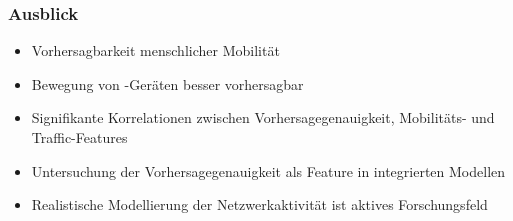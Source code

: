 \documentclass{beamer}
\begin{document}
\begin{frame}
  \frametitle{Ausblick}
  
  \begin{itemize}
    \item Vorhersagbarkeit menschlicher Mobilität
    \item Bewegung von -Geräten besser vorhersagbar
    \item Signifikante Korrelationen zwischen Vorhersagegenauigkeit, Mobilitäts- und Traffic-Features
    \item Untersuchung der Vorhersagegenauigkeit als Feature in integrierten Modellen
    \item Realistische Modellierung der Netzwerkaktivität ist aktives Forschungsfeld
    
  \end{itemize}
  
\end{frame}





\end{document}
